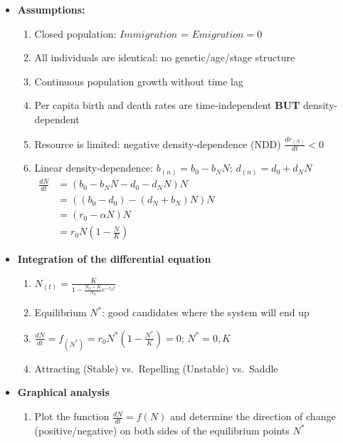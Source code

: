 \documentclass[
]{book}
\providecommand{\tightlist}{%
  \setlength{\itemsep}{0pt}\setlength{\parskip}{0pt}}
\begin{document}
\begin{itemize}
\tightlist
\item
  \textbf{Assumptions:}

  \begin{enumerate}
  \def\labelenumi{\arabic{enumi}.}
  \tightlist
  \item
    Closed population: \(Immigration\) = \(Emigration = 0\)
  \item
    All individuals are identical: no genetic/age/stage structure
  \item
    Continuous population growth without time lag
  \item
    Per capita birth and death rates are time-independent \textbf{BUT} density-dependent
  \item
    Resource is limited: negative density-dependence (NDD)
    \(\frac{dr_{(N)}}{dt} < 0\)
  \item
    Linear density-dependence: \(b_{(n)} = b_{0}-b_{N}N\); \(d_{(n)} = d_{0}+d_{N}N\)
    \(\begin{aligned}\frac{dN}{dt}&=(b_{0}-b_{N}N-d_{0}-d_{N}N)N\\&=((b_{0}-d_{0})-(d_{N}+b_{N})N)N\\&=(r_{0}-\alpha N)N\\&=r_{0}N(1-\frac{N}{K})\end{aligned}\)
  \end{enumerate}
\end{itemize}

\begin{itemize}
\tightlist
\item
  \textbf{Integration of the differential equation}

  \begin{enumerate}
  \def\labelenumi{\arabic{enumi}.}
  \tightlist
  \item
    \(N_{(t)} = \frac{K}{1-\frac{N_{0}-K}{N_{0}}e^{-r_{0}t}}\)
  \item
    Equilibrium \(N^*\): good candidates where the system will end up
  \item
    \(\frac{dN}{dt} = f_{(N^*)} = r_{0}N^{*}(1-\frac{N^*}{K}) = 0\); \(N^* = 0, K\)
  \item
    Attracting (Stable) vs.~Repelling (Unstable) vs.~Saddle
  \end{enumerate}
\end{itemize}

\begin{itemize}
\tightlist
\item
  \textbf{Graphical analysis}

  \begin{enumerate}
  \def\labelenumi{\arabic{enumi}.}
  \tightlist
  \item
    Plot the function \(\frac{dN}{dt} = f(N)\) and determine the direction of change (positive/negative) on both sides of the equilibrium points \(N^*\)
  \end{enumerate}
\end{itemize}
\end{document}

